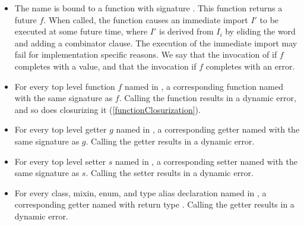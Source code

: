 \documentclass[makeidx]{article}
\begin{document}
{\begin{itemize}
\item The name  is bound to
  a function with signature .
  This function returns a future $f$.
  When called, the function causes
  an immediate import $I'$ to be executed at some future time,
  where $I'$ is derived from $I_i$ by eliding the word \DEFERRED{}
  and adding a \HIDE{}  combinator clause.
  The execution of the immediate import may fail
  for implementation specific reasons.
  We say that the invocation of 
   if $f$ completes with a value,
  and that the invocation
   if $f$ completes with an error.
\item
  For every top level function $f$ named \id{} in
  ,
  a corresponding function named \id{} with the same signature as $f$.
  Calling the function results in a dynamic error,
  and so does closurizing it
  (\ref{functionClosurization}).
\item
  For every top level getter $g$ named \id{} in
  ,
  a corresponding getter named \id{} with the same signature as $g$.
  Calling the getter results in a dynamic error.
\item
  For every top level setter $s$ named \code{\id=} in
  ,
  a corresponding setter named \code{\id=} with the same signature as $s$.
  Calling the setter results in a dynamic error.
\item
  For every class, mixin, enum, and type alias declaration named \id{} in
  ,
  a corresponding getter named \id{} with return type .
  Calling the getter results in a dynamic error.
\end{itemize}


}
\end{document}
